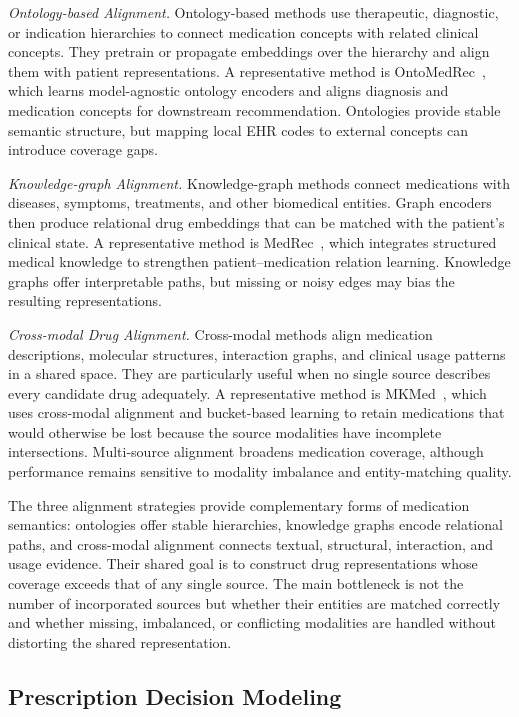 \documentclass[manuscript,review]{acmart}
\begin{document}
\textit{Ontology-based Alignment.} Ontology-based methods use therapeutic, diagnostic, or indication hierarchies to connect medication concepts with related clinical concepts. They pretrain or propagate embeddings over the hierarchy and align them with patient representations. A representative method is OntoMedRec~\cite{tan2024ontomedrec}, which learns model-agnostic ontology encoders and aligns diagnosis and medication concepts for downstream recommendation. Ontologies provide stable semantic structure, but mapping local EHR codes to external concepts can introduce coverage gaps.

\textit{Knowledge-graph Alignment.} Knowledge-graph methods connect medications with diseases, symptoms, treatments, and other biomedical entities. Graph encoders then produce relational drug embeddings that can be matched with the patient's clinical state. A representative method is MedRec~\cite{zhang2023medrec}, which integrates structured medical knowledge to strengthen patient--medication relation learning. Knowledge graphs offer interpretable paths, but missing or noisy edges may bias the resulting representations.

\textit{Cross-modal Drug Alignment.} Cross-modal methods align medication descriptions, molecular structures, interaction graphs, and clinical usage patterns in a shared space. They are particularly useful when no single source describes every candidate drug adequately. A representative method is MKMed~\cite{li2025bucket}, which uses cross-modal alignment and bucket-based learning to retain medications that would otherwise be lost because the source modalities have incomplete intersections. Multi-source alignment broadens medication coverage, although performance remains sensitive to modality imbalance and entity-matching quality.

The three alignment strategies provide complementary forms of medication semantics: ontologies offer stable hierarchies, knowledge graphs encode relational paths, and cross-modal alignment connects textual, structural, interaction, and usage evidence. Their shared goal is to construct drug representations whose coverage exceeds that of any single source. The main bottleneck is not the number of incorporated sources but whether their entities are matched correctly and whether missing, imbalanced, or conflicting modalities are handled without distorting the shared representation.

\subsection{Prescription Decision Modeling}
\end{document}
